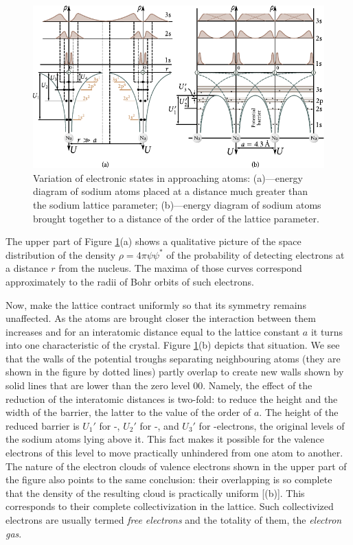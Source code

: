 \begin{figure}[t]
	\begin{center}
		\includegraphics[scale=0.98]{figures/ch_05/fig_5_3.pdf}
		\caption[]{Variation of electronic states in approaching atoms: (a)---energy diagram of sodium atoms placed at a distance much greater than the sodium lattice parameter; (b)---energy diagram of sodium atoms brought together to a distance of the order of the lattice parameter.}
		\label{fig:5_3}
	\end{center}
	\vspace{-0.7cm}
\end{figure}

The upper part of Figure \ref{fig:5_3}(a) shows a qualitative picture of the space distribution of the density $\rho=4\pi\psi\psi^*$ of the probability of detecting electrons at a distance $r$ from the nucleus. The maxima of those curves correspond approximately to the radii of Bohr orbits of such electrons.

Now, make the lattice contract uniformly so that its symmetry remains unaffected. As the atoms are brought closer the interaction between them increases and for an interatomic distance equal to the lattice constant $a$ it turns into one characteristic of the crystal. Figure \ref{fig:5_3}(b) depicts that situation. We see that the walls of the potential troughs separating neighbouring atoms (they are shown in the figure by dotted lines) partly overlap to create new walls shown by solid lines that are lower than the zero level $00$.
Namely, the effect of the reduction of the interatomic distances is two-fold: to reduce the height and the width of the barrier, the latter to the value of the order of $a$. The height of the reduced barrier is $U_1'$ for -, $U_2'$ for -, and $U_3'$ for -electrons, the original  levels of the sodium atoms lying above it. This fact makes it possible for the valence electrons of this level to move practically unhindered from one atom to another. The nature of the electron clouds of valence electrons shown in the upper part of the figure also points to the same conclusion: their overlapping is so complete that the density of the resulting cloud is practically uniform [(b)]. This corresponds to their complete collectivization in the lattice. Such collectivized electrons are usually termed \textit{free electrons} and the totality of them, the \textit{electron gas}.

